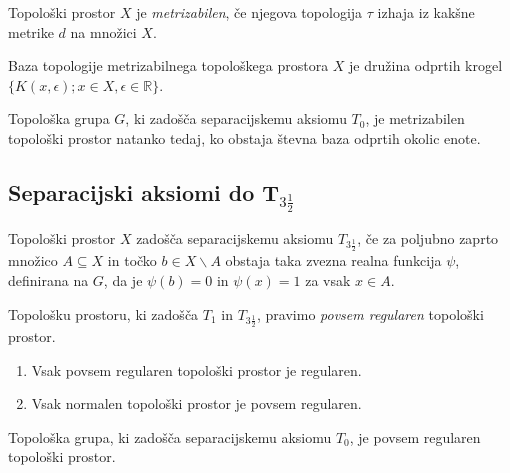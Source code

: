 \documentclass[mat1]{fmfdelo}
\newcommand{\R}{\mathbb R}
\begin{document}
\begin{definicija}\label{def:metrizabilnost}
Topološki prostor $X$ je \emph{metrizabilen}, če njegova topologija $\tau$ izhaja iz kakšne metrike $d$ na množici $X$.
\end{definicija}

\begin{opomba}
Baza topologije metrizabilnega topološkega prostora $X$ je družina odprtih krogel $\lbrace K(x, \epsilon); x \in X, \epsilon \in \R \rbrace$.
\end{opomba}

\begin{izrek}\label{izr:metrizabilnost}
	Topološka grupa $G$, ki zadošča separacijskemu aksiomu $T_0$, je metrizabilen topološki prostor natanko tedaj, ko obstaja števna baza odprtih okolic enote.
\end{izrek}

\subsection{Separacijski aksiomi do T$_{3 \frac{1}{2}}$}

\begin{definicija}
	Topološki prostor $X$ zadošča separacijskemu aksiomu $T_{3 \frac{1}{2}}$, če za poljubno zaprto množico $A \subseteq X$ in točko $b \in X\backslash A$ obstaja taka zvezna realna funkcija $\psi$, definirana na $G$, da je $\psi (b) = 0$ in $\psi (x) = 1$ za vsak $x \in A$.
\end{definicija}

\begin{opomba}
	Topološku prostoru, ki zadošča $T_1$ in $T_{3 \frac{1}{2}}$, pravimo \emph{povsem regularen} topološki prostor.
\end{opomba}


\begin{trditev}\label{pos:reghaus}
	\begin{enumerate}
		\item Vsak povsem regularen topološki prostor je regularen.
		\item Vsak normalen topološki prostor je povsem regularen.
	\end{enumerate}
\end{trditev}

\begin{izrek}\label{izr:t3pol}
	Topološka grupa, ki zadošča separacijskemu aksiomu $T_0$, je povsem regularen topološki prostor.
\end{izrek}
\end{document}
